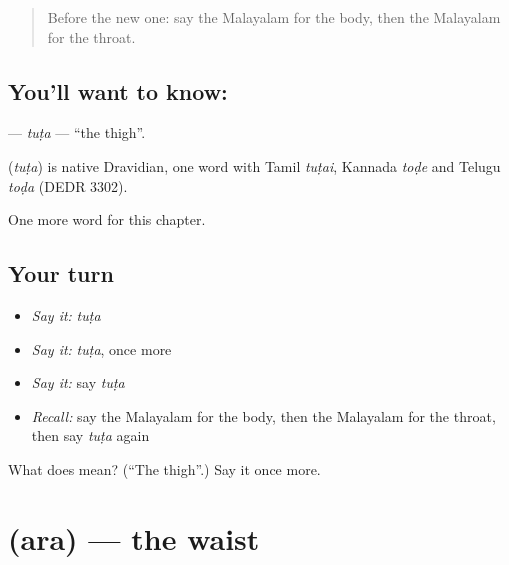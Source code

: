 \label{lesson:ML-C192-tuta}



\begin{quote}
Before the new one: say the Malayalam for the body, then the Malayalam for the throat.
\end{quote}

\subsection*{You'll want to know: }
\textbf{} — \emph{tuṭa} — \textquotedblleft{}the thigh\textquotedblright{}.

\begin{cousinweb}
\textbf{} (\emph{tuṭa}) is native Dravidian, one word with Tamil \emph{tuṭai}, Kannada \emph{toḍe} and Telugu \emph{toḍa} (DEDR 3302).
\end{cousinweb}

\begin{grammarlens}[title={What you've built}]
One more word for this chapter.
\end{grammarlens}

\subsection*{Your turn}
\begin{itemize}
\raggedright
  \item \emph{Say it:} \emph{tuṭa}
  \item \emph{Say it:} \emph{tuṭa}, once more
  \item \emph{Say it:} say \emph{tuṭa}
  \item \emph{Recall:} say the Malayalam for the body, then the Malayalam for the throat, then say \emph{tuṭa} again
\end{itemize}

\begin{tcolorbox}[breakable,colback=teal!4,colframe=teal!35!black,title={Before you move on}]
What does  mean? (\textquotedblleft{}The thigh\textquotedblright{}.) Say it once more.
\end{tcolorbox}
\section[\texorpdfstring{\ml{അര} (ara)}{അര (ara)}]{ (ara) — the waist}

\label{lesson:ML-C192-ara}




